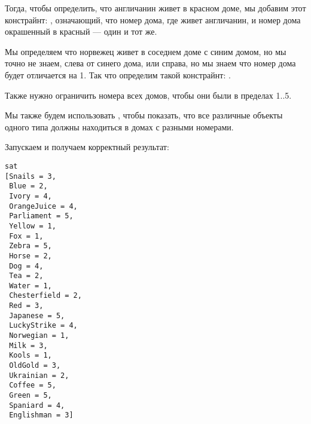 Тогда, чтобы определить, что англичанин живет в красном доме, мы добавим этот констрайнт: , означающий, что номер дома, где живет англичанин, и номер дома окрашенный в красный --- один и тот же.

Мы определяем что норвежец живет в соседнем доме с синим домом, но мы точно не знаем, слева от синего дома, или справа,
но мы знаем что номер дома будет отличается на 1.
Так что определим такой констрайнт: .

Также нужно ограничить номера всех домов, чтобы они были в пределах 1..5.

Мы также будем использовать , чтобы показать, что все различные объекты одного типа должны находиться в домах
с разными номерами.



Запускаем и получаем корректный результат:

\begin{lstlisting}
sat
[Snails = 3,
 Blue = 2,
 Ivory = 4,
 OrangeJuice = 4,
 Parliament = 5,
 Yellow = 1,
 Fox = 1,
 Zebra = 5,
 Horse = 2,
 Dog = 4,
 Tea = 2,
 Water = 1,
 Chesterfield = 2,
 Red = 3,
 Japanese = 5,
 LuckyStrike = 4,
 Norwegian = 1,
 Milk = 3,
 Kools = 1,
 OldGold = 3,
 Ukrainian = 2,
 Coffee = 5,
 Green = 5,
 Spaniard = 4,
 Englishman = 3]
\end{lstlisting}

